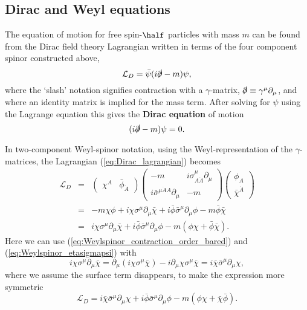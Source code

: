 \documentclass[notes.tex]{subfiles}
\begin{document}
\subsection{Dirac and Weyl equations}
\label{sec:fermion_eoms}

The equation of motion for free spin-$\half$ particles with mass $m$ can be found from the Dirac field theory Lagrangian written in terms of the  four component spinor constructed above,
\begin{equation}
\mathcal L_D = \bar\psi (i \slashed{\partial}-m)\psi,
\label{eq:Dirac_lagrangian}
\end{equation}
where the `slash' notation signifies contraction with a $\gamma$-matrix, $\slashed{\partial}\equiv\gamma^\mu\partial_\mu$, and where an identity matrix is implied for the mass term. After solving for $\psi$ using the Lagrange equation this gives the {\bf Dirac equation} of motion
\begin{equation}
(i\slashed{\partial} -m)\psi=0.
\end{equation}

In two-component Weyl-spinor notation, using the Weyl-representation of the $\gamma$-matrices, the Lagrangian (\ref{eq:Dirac_lagrangian}) becomes
\begin{eqnarray*}
\mathcal L_D &=& \begin{pmatrix}  \chi^A & \bar{\phi}_{\dot A} \end{pmatrix} \left(\begin{matrix} -m  & i\sigma^\mu_{A\dot A}\partial_\mu \\  i\bar\sigma^{\mu\dot A A}\partial_\mu& -m \end{matrix}\right) \begin{pmatrix}\phi_A\\ \bar{\chi}^{\dot{A}}\end{pmatrix} \\
&=& -m  \chi \phi + i\chi\sigma^\mu\partial_\mu\bar\chi+ i\bar\phi\bar\sigma^\mu\partial_\mu\phi -m\bar\phi\bar\chi \\
&=& i\chi\sigma^\mu\partial_\mu\bar\chi+ i\bar\phi\bar\sigma^\mu\partial_\mu\phi  -m  (\phi\chi  + \bar\phi\bar\chi).  
\end{eqnarray*}
Here we can use (\ref{eq:Weylspinor_contraction_order_bared}) and (\ref{eq:Weylspinor_etasigmapsi}) with
\begin{equation}
i\chi\sigma^\mu\partial_\mu\bar\chi = \partial_\mu (i\chi\sigma^\mu\bar\chi) - i\partial_\mu\chi\sigma^\mu\bar\chi =  i\bar\chi\bar\sigma^\mu\partial_\mu\chi,
\end{equation}
where we assume the surface term disappears, to make the expression more symmetric
\begin{equation*}
\mathcal L_D = i\bar\chi\bar\sigma^\mu\partial_\mu\chi+ i\bar\phi\bar\sigma^\mu\partial_\mu\phi  -m  (\phi\chi  + \bar\chi\bar\phi).  
\end{equation*}
\end{document}
